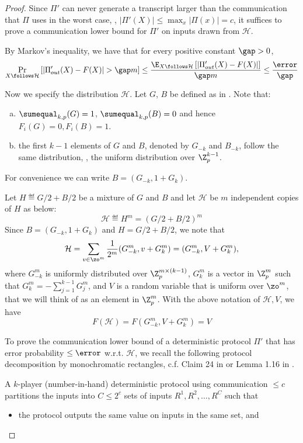 \begin{proof}
		Since $\Pi'$ can never generate a transcript larger than the communication that $\Pi$ uses in the worst case, \ie, $|\Pi'(X)| \le  \max_x |\Pi(x)| =c$,
		it suffices to prove a communication lower bound for $\Pi'$ on inputs drawn from $\mathcal{H}$. 


		By Markov's inequality, we have that for every positive constant $\gap>0$,
		\begin{align}\label{ineq:Pi'}
		\Pr_{X\follows \mathcal{H}}\left[ \left| \Pi'_{out}(X) - F(X)\right| > \gap m \right] \le \frac{\E_{X\follows \mathcal{H}}\left[ \left| \Pi'_{out}(X) - F(X)\right| \right]}{\gap m}\le \frac{\error}{\gap}
		\end{align}



		Now we specify the distribution $\mathcal{H}$.
%
		Let $G$, $B$ be defined as in .	Note that:
%
%
\begin{enumerate}[(a)]  %
\item $\sumequal_{k,p}(G)=1$, $\sumequal_{k,p}(B)=0$ and hence $F_i(G)=0, F_i(B)=1$.
\item the first $k-1$ elements of $G$ and $B$, denoted by $G_{-k}$ and $B_{-k}$, follow the same distribution, \ie, the uniform distribution over $\Z_p^{k-1}$.
\end{enumerate}
%
%
		For convenience we can write $B=(G_{-k},1+G_k)$.

		Let $H\eqdef G/2+B/2$ be a mixture of $G$ and $B$ and let $\mathcal{H}$ be $m$ independent copies of $H$ as below:
		\[\mathcal{H} \eqdef H^m = \left(G/2+B/2\right)^m\]
		Since $B=(G_{-k},1+G_k)$ and $H=G/2+B/2$, we note that
		\[\mathcal{H} = \sum_{v\in\zo^m} \frac{1}{2^m} (G^m_{-k}, v+G^m_k)=(G^m_{-k}, V+G^m_k),\]
		where $G^m_{-k}$ is uniformly distributed over $\Z_p^{m\times (k-1)}$, $G_k^m$ is a vector in $\Z_p^m$ such that $G_k^m=-\sum_{j=1}^{k-1} G^m_j$, and $V$ is a random variable that is uniform over $\zo^m$, that we will think of as an element in  $\Z_p^m$.
		With the above notation of $\mathcal{H}, V$, we have
		\[F(\mathcal{H})=F(G^m_{-k}, V+G^m_k)=V\]

		To prove the communication lower bound of a deterministic protocol $\Pi'$ that has error probability $\le \error$ w.r.t. $\mathcal{H}$, 
		we recall the following protocol decomposition by monochromatic rectangles, c.f. Claim 24 in  \cite{Viola:2013we}  or Lemma 1.16 in \cite{kushilevitz1997communication}.

		\begin{claim}\label{claim: rectangle}
		A $k$-player (number-in-hand) deterministic protocol using communication $\le c$ partitions the inputs into $C\le 2^c $ sets of inputs $R^1,R^2,\ldots, R^C$ such that
			\begin{itemize}
				\item the protocol outputs the same value on inputs in the same set, and


\end{itemize}
\end{claim}
\end{proof}
